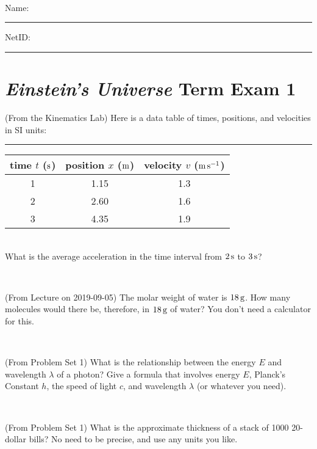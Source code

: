 \documentclass[12pt, letterpaper]{article}
\begin{document}
\vfill ~


\cleardoublepage



\noindent
Name: \rule[-1ex]{0.60\textwidth}{0.1pt}
NetID: \rule[-1ex]{0.20\textwidth}{0.1pt}

\section*{\textsl{Einstein's Universe} Term Exam 1}
\setcounter{problem}{1}


\begin{problem} (From the Kinematics Lab)
Here is a data table of times, positions, and velocities in SI units:\\
\rule{1.0in}{0pt}\begin{tabular}{c|c|c}
time $t$ ($\mathrm{s}$) & position $x$ ($\mathrm{m}$) & velocity $v$ ($\mathrm{m}\,\mathrm{s}^{-1}$) \\
\hline
1 & 1.15 & 1.3 \\
2 & 2.60 & 1.6 \\
3 & 4.35 & 1.9 \\
\hline
\end{tabular}\\
What is the average acceleration in the time interval from $2\,\mathrm{s}$ to $3\,\mathrm{s}$?
\end{problem}


\vfill ~

\begin{problem} (From Lecture on 2019-09-05)
The molar weight of water is $18\,\mathrm{g}$. How many molecules would there
be, therefore, in $18\,\mathrm{g}$ of water? You don't need a calculator for
this.
\end{problem}


\vfill ~

\begin{problem} (From Problem Set 1)
What is the relationship between the energy $E$ and wavelength
$\lambda$ of a photon? Give a formula that involves energy $E$,
Planck's Constant $h$, the speed of light $c$, and wavelength
$\lambda$ (or whatever you need).
\end{problem}

\vfill ~

\begin{problem} (From Problem Set 1)
What is the approximate thickness of a stack of 1000 20-dollar bills?
No need to be precise, and use any units you like.
\end{problem}


\vfill ~
\end{document}
